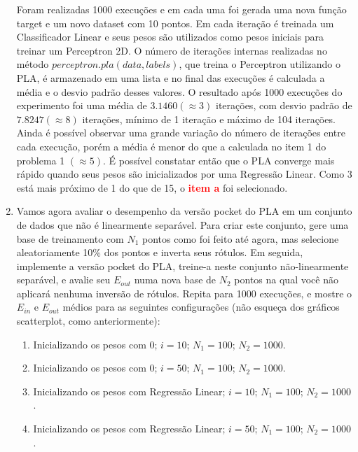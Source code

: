 \begin{enumerate}
    Foram realizadas 1000 execuções e em cada uma foi gerada uma nova função target e um novo dataset com 10 pontos. Em cada iteração é treinada um Classificador Linear e seus pesos são utilizados como pesos iniciais para treinar um Perceptron 2D. O número de iterações internas realizadas no método $perceptron.pla(data,labels)$, que treina o Perceptron utilizando o PLA, é armazenado em uma lista e no final das execuções é calculada a média e o desvio padrão desses valores. O resultado após 1000 execuções do experimento foi uma média de $3.1460(\approx 3)$ iterações, com desvio padrão de $7.8247(\approx 8)$ iterações, mínimo de 1 iteração e máximo de 104 iterações. Ainda é possível observar uma grande variação do número de iterações entre cada execução, porém a média é menor do que a calculada no item 1 do problema 1 $(\approx 5)$. É possível constatar então que o PLA converge mais rápido quando seus pesos são inicializados por uma Regressão Linear. Como 3 está mais próximo de 1 do que de 15, o \textcolor{red}{\textbf{item a}} foi selecionado. 
    
    \item Vamos agora avaliar o desempenho da versão pocket do PLA em um conjunto de dados que não é linearmente separável. Para criar este conjunto, gere uma base de treinamento com $N_1$ pontos como foi feito até agora, mas selecione aleatoriamente 10\% dos pontos e inverta seus rótulos. Em seguida, implemente a versão pocket do PLA, treine-a neste conjunto não-linearmente separável, e avalie seu $E_{out}$ numa nova base de $N_2$ pontos na qual você não aplicará nenhuma inversão de rótulos. Repita para 1000 execuções, e mostre o $E_{in}$ e $E_{out}$ médios para as seguintes configurações (não esqueça dos gráficos scatterplot, como anteriormente):
    
    \begin{enumerate}
        \item Inicializando os pesos com 0; $i = 10$; $N_1 = 100$; $N_2 = 1000$.
        \item Inicializando os pesos com 0; $i = 50$; $N_1 = 100$; $N_2 = 1000$.
        \item Inicializando os pesos com Regressão Linear; $i = 10$; $N_1 = 100$; $N_2 = 1000$.
        \item Inicializando os pesos com Regressão Linear; $i = 50$; $N_1 = 100$; $N_2 = 1000$.
    \end{enumerate}

    
\end{enumerate}